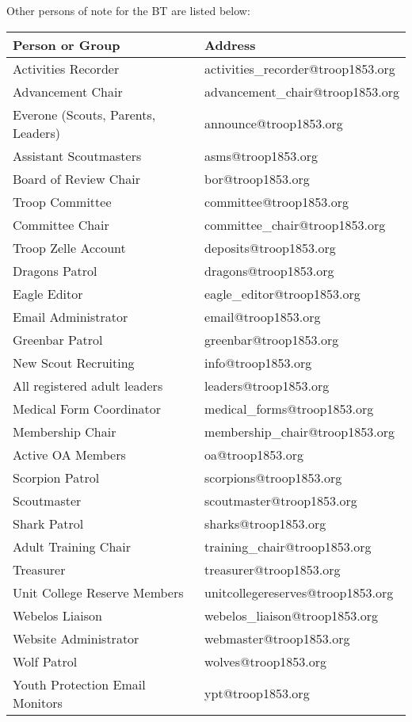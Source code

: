 \documentclass{ltxguide}
\begin{document}
Other persons of note for the \ac{BT} are listed below:

\begin{tabular}{ l l }
	\textbf{Person or Group} & \textbf{Address} \\
	\hline
	Activities Recorder 				& activities\_recorder@troop1853.org \\
	Advancement Chair 					& advancement\_chair@troop1853.org \\
	Everone (Scouts, Parents, Leaders)	& announce@troop1853.org \\
	Assistant Scoutmasters				& asms@troop1853.org \\
	Board of Review Chair				& bor@troop1853.org \\
	Troop Committee						& committee@troop1853.org \\
	Committee Chair						& committee\_chair@troop1853.org \\
	Troop Zelle Account					& deposits@troop1853.org \\
	Dragons Patrol						& dragons@troop1853.org \\
	Eagle Editor						& eagle\_editor@troop1853.org \\
	Email Administrator					& email@troop1853.org \\
	Greenbar Patrol						& greenbar@troop1853.org \\
	New Scout Recruiting				& info@troop1853.org \\
	All registered adult leaders		& leaders@troop1853.org \\
	Medical Form Coordinator			& medical\_forms@troop1853.org \\
	Membership Chair					& membership\_chair@troop1853.org \\
	Active OA Members					& oa@troop1853.org \\
	Scorpion Patrol						& scorpions@troop1853.org \\
	Scoutmaster							& scoutmaster@troop1853.org \\
	Shark Patrol						& sharks@troop1853.org \\
	Adult Training Chair				& training\_chair@troop1853.org \\
	Treasurer							& treasurer@troop1853.org \\
	Unit College Reserve Members		& unitcollegereserves@troop1853.org \\
	Webelos Liaison						& webelos\_liaison@troop1853.org \\
	Website Administrator				& webmaster@troop1853.org \\
	Wolf Patrol							& wolves@troop1853.org \\
	Youth Protection Email Monitors		& ypt@troop1853.org \\
	\hline
\end{tabular}
\end{document}
